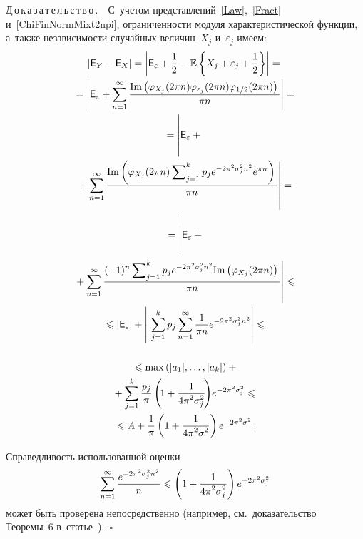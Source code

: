 \begin{multicols}{2}
\noindent
Д\,о\,к\,а\,з\,а\,т\,е\,л\,ь\,с\,т\,в\,о\,.\ \
С~учетом пред\-став\-ле\-ний~\eqref{Law},~\eqref{Fract} и~\eqref{ChiFinNormMixt2npi}, 
ограниченности модуля характеристической функции, а~также не\-за\-ви\-си\-мости 
случайных величин~$X_j$ и~$\varepsilon_j$ имеем:
\begin{multline*}
\left\lvert {\sf E}_Y-{\sf E}_X\right\rvert =
\left\lvert {\sf E}_\varepsilon+\fr{1}{2}-\mathbb{E}\left\{X_j+
\varepsilon_j+\fr{1}{2}\right\}\right\rvert={}\\
{}=\left\lvert {\sf E}_\varepsilon+\sum\limits_{n=1}^\infty
\fr{\mathrm{Im} \left(\varphi_{X_j}(2\pi n)\varphi_{\varepsilon_j}(2\pi n)
\varphi_{1/2}(2\pi n)\right)}{\pi n}\right\rvert={}\\
=\left\lvert 
\vphantom{\fr{(-1)^n\sum\nolimits_{j=1}^{k}p_j e^{-2\pi^2 \sigma_j^2 n^2} 
\mathrm{Im} \left(\varphi_{X_j}(2\pi n)\right)}{\pi n}}
{\sf E}_\varepsilon+{}\right.\\
\left.{}+\sum\limits_{n=1}^\infty
\fr{\mathrm{Im} \left(\varphi_{X_j}(2\pi n) 
\sum\nolimits_{j=1}^{k}p_j e^{-2\pi^2 \sigma_j^2 n^2} 
e^{\pi n}\right)}{\pi n}\right\rvert={}\\
{}=\left\lvert 
\vphantom{\fr{(-1)^n\sum\nolimits_{j=1}^{k}p_j e^{-2\pi^2 \sigma_j^2 n^2} 
\mathrm{Im} \left(\varphi_{X_j}(2\pi n)\right)}{\pi n}}
{\sf E}_\varepsilon+{}\right.\\
\left.{}+\sum\limits_{n=1}^\infty
\fr{(-1)^n\sum\nolimits_{j=1}^{k}p_j e^{-2\pi^2 \sigma_j^2 n^2} 
\mathrm{Im} \left(\varphi_{X_j}(2\pi n)\right)}{\pi n}\right\rvert\leqslant{}\\
{}\leqslant \left\lvert {\sf E}_\varepsilon\right\rvert+\left\lvert\
\sum\limits_{j=1}^{k}p_j\sum\limits_{n=1}^\infty 
\fr{1}{\pi n} e^{-2\pi^2 \sigma_j^2 n^2}\right\rvert\leqslant {}\\
\\
{}\leqslant
\max\left(|a_1|,\ldots,|a_k|\right)+{}\\
{}+\sum\limits_{j=1}^{k} 
\fr{p_j}{\pi} \left(\!1+\fr{1}{4\pi^2\sigma_j^2}\!\right)\!e^{-2\pi^2\sigma_j^2}\leqslant{}\\
{}\leqslant
A+\fr{1}\pi\left(1+\fr{1}{4\pi^2\sigma^2}\right)e^{-2\pi^2\sigma^2}\,.
\end{multline*}

Справедливость использованной оценки 
\begin{equation*}
\sum\limits_{n=1}^\infty
\displaystyle\frac{\displaystyle e^{-2\pi^2 \sigma_j^2 n^2}\mathstrut}{\displaystyle n\mathstrut}\leqslant 
\left(1+\displaystyle\frac{\displaystyle 1\mathstrut}{\displaystyle 4\pi^2\sigma_j^2\mathstrut}\right)e^{-2\pi^2\sigma_j^2}
\end{equation*}
может быть проверена непосредственно (например, см.\ доказательство Теоремы~6 
в~статье~\cite{Ushakov2017b}).~\hfill$\square$


\end{multicols}
